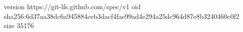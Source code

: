 version https://git-lfs.github.com/spec/v1
oid sha256:6d37aa38dc6a945884ceb3dacf4fae99ad4e294a25dc964d87e8b3240460c0f2
size 35176
